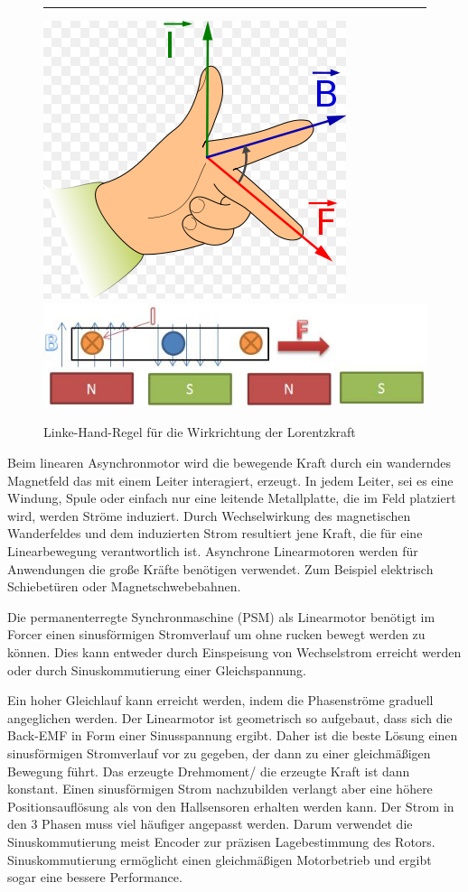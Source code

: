 \begin{description}[leftmargin=2.5cm]
\begin{figure}[h]
						\centering \rule{2.5cm}{0cm}
						\includegraphics[width=0.2\linewidth]{./pics/el/I.png} \hspace{1cm}
						\includegraphics[width=0.5\linewidth]{./pics/el/LM2} 
						\caption{Linke-Hand-Regel für die Wirkrichtung der Lorentzkraft}
						\label{}
					\end{figure}
					
					\item[Asynhroner Linearmotor] 
					Beim linearen Asynchronmotor wird die bewegende Kraft durch ein wanderndes Magnetfeld das mit einem Leiter interagiert, erzeugt. In jedem Leiter, sei es eine Windung, Spule oder einfach nur eine leitende Metallplatte, die im Feld platziert wird, werden Ströme induziert. Durch Wechselwirkung des magnetischen Wanderfeldes und dem induzierten Strom resultiert jene Kraft, die für eine Linearbewegung verantwortlich ist. Asynchrone Linearmotoren werden für Anwendungen die große Kräfte benötigen verwendet. Zum Beispiel elektrisch Schiebetüren oder Magnetschwebebahnen.
					
					\item[PSM als Linearmotor] 
					Die permanenterregte Synchronmaschine (PSM) als Linearmotor benötigt im Forcer einen sinusförmigen Stromverlauf um ohne rucken bewegt werden zu können. Dies kann entweder durch Einspeisung von Wechselstrom erreicht werden oder durch Sinuskommutierung einer Gleichspannung. 
					
					\item[Sinuskommutierung]										
					Ein hoher Gleichlauf kann erreicht werden, indem die Phasenströme graduell angeglichen werden. Der Linearmotor ist geometrisch so aufgebaut, dass sich die Back-EMF in Form einer Sinusspannung ergibt. Daher ist die beste Lösung einen sinusförmigen Stromverlauf vor zu gegeben, der dann zu einer gleichmäßigen Bewegung führt. Das erzeugte Drehmoment/ die erzeugte Kraft ist dann konstant. Einen sinusförmigen Strom nachzubilden verlangt aber eine höhere Positionsauflösung als von den Hallsensoren erhalten werden kann. Der Strom in den 3 Phasen muss viel häufiger angepasst werden. Darum verwendet die Sinuskommutierung meist Encoder zur präzisen Lagebestimmung des Rotors. Sinuskommutierung ermöglicht einen gleichmäßigen Motorbetrieb und ergibt sogar eine bessere Performance.						
				\end{description}
				
